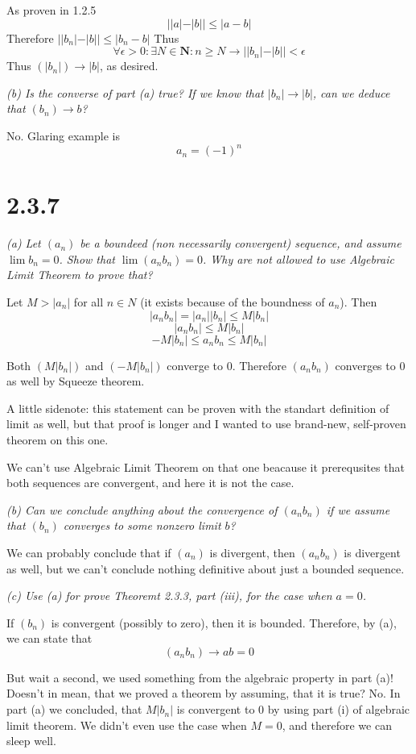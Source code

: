\documentclass[11pt,oneside,titlepage]{book}
\begin{document}
As proven in 1.2.5
$$||a| - |b|| \leq |a - b|$$
Therefore  $ ||b_n| - |b|| \leq |b_n - b| $
Thus
$$\forall \epsilon > 0: \exists N \in \textbf{N}: n \geq N \to ||b_n| - |b|| < \epsilon$$
Thus $(|b_n|) \to |b|$, as desired.

\textit{(b) Is the converse of part (a) true? If we know that $|b_n| \to |b|$,
  can we deduce that $(b_n) \to b$?}

No. Glaring example is
$$a_n = (-1)^n$$

\section*{2.3.7}
\textit{(a) Let $(a_n)$ be a boundeed (non necessarily convergent) sequence,
  and assume $\lim b_n = 0$. Show that $\lim (a_n b_n) = 0$. Why are not
  allowed to use Algebraic Limit Theorem to prove that?}

Let $M > |a_n|$ for all $n \in N$ (it exists because of the boundness of $a_n$).
Then
$$ |a_n b_n| = |a_n||b_n| \leq M |b_n|$$
$$ |a_n b_n| \leq  M |b_n|$$
$$ -M|b_n| \leq a_n b_n \leq  M |b_n|$$

Both $(M|b_n|)$ and $(-M|b_n|)$ converge to 0. Therefore $(a_n b_n)$ converges
to 0 as well by Squeeze theorem.

A little sidenote: this statement can be proven with the standart definition
of limit as well, but that proof is longer and I wanted to use brand-new,
self-proven theorem on this one.

We can't use Algebraic Limit Theorem on that one beacause it prerequsites
that both sequences are convergent, and here it is not the case.

\textit{(b) Can we conclude anything about the convergence of $(a_n b_n)$
  if we assume that $(b_n)$ converges to some nonzero limit $b$?}

We can probably conclude that if $(a_n)$ is divergent, then $(a_n b_n)$ is
divergent as well, but we can't conclude nothing definitive about
just a bounded sequence.

\textit{(c) Use (a) for prove Theoremt 2.3.3, part (iii), for the case when
  $a = 0$.}

If $(b_n)$ is convergent (possibly to zero), then it is bounded.
Therefore, by (a), we can state that
$$(a_n b_n) \to a b = 0$$

But wait a second, we used something from the algebraic property in part (a)!
Doesn't in mean, that we proved a theorem by assuming, that it is true? No.
In part (a) we concluded, that $M|b_n|$ is convergent to 0 by using
part (i) of algebraic limit theorem. We didn't even use the case when
$M = 0$, and therefore we can sleep well.
\end{document}
